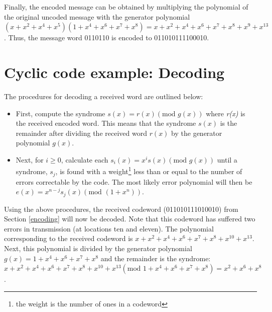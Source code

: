 \documentclass[12pt]{report}
\begin{document}
Finally, the encoded message can be obtained by multiplying the polynomial of the original uncoded message
with the generator polynomial $ (x + x^{2} + x^{4} + x^{5}) (1+x^{4}+x^{6}+x^{7}+x^{8}) = x+x^{2}+x^{4}+x^{6}+x^{7}+x^{8}+x^{9}+x^{13}$.
Thus, the message word 0110110 is encoded to 011010111100010.

\section{Cyclic code example: Decoding}
\label{decoding}
The procedures for decoding a received word are outlined below:
\begin{itemize}
	\item First, compute the syndrome $s(x) = r(x) (\mbox{mod } g(x))$ 
	where \emph{r(x)} is the received encoded word.
	This means that the syndrome $s(x)$ is the remainder after dividing 
	the received word $r(x)$ by the generator polynomial $g(x)$.
	\item Next, for $i \geq 0$, calculate each $s_{i}(x) = x^{i}s(x)(\mbox{mod } g(x))$ 
	until a syndrome, $s_{j}$, is found
	with a weight\footnote{the weight is the number of ones in a codeword} less than or 
	equal to the number of errors correctable by the code. The most likely error polynomial 
	will then be $e(x) = x^{n-j}s_{j}(x)(\mbox{mod } (1+x^{n}))$.
\end{itemize}

Using the above procedures, the received codeword (011010111{\color{Red}01}0010) 
from Section \ref{encoding} will now be decoded.
Note that this codeword has suffered two errors in transmission (at locations {\color{Red}ten} 
and {\color{Red}eleven}).
The polynomial corresponding to the received codeword is $x+x^{2}+x^{4}+x^{6}+x^{7}+x^{8}+x^{10}+x^{13}$.
Next, this polynomial is divided by the generator polynomial $g(x) = 1+x^{4}+x^{6}+x^{7}+x^{8}$ and the remainder is 
the syndrome: $x+x^{2}+x^{4}+x^{6}+x^{7}+x^{8}+x^{10}+x^{13} (\mbox{mod } 1+x^{4}+x^{6}+x^{7}+x^{8}) = x^{2}+x^{6}+x^{8}$. 
\end{document}
